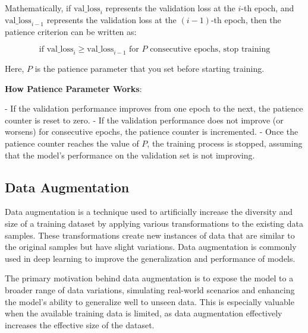 \documentclass{report}
\begin{document}
Mathematically, if \( \text{val\_loss}_i \) represents the validation loss at the \( i \)-th epoch, and \( \text{val\_loss}_{i-1} \) represents the validation loss at the \( (i-1) \)-th epoch, then the patience criterion can be written as:

\[ \text{if } \text{val\_loss}_i \geq \text{val\_loss}_{i-1} \text{ for } P \text{ consecutive epochs, stop training} \]

Here, \( P \) is the patience parameter that you set before starting training.

\textbf{How Patience Parameter Works}:

- If the validation performance improves from one epoch to the next, the patience counter is reset to zero.
- If the validation performance does not improve (or worsens) for consecutive epochs, the patience counter is incremented.
- Once the patience counter reaches the value of \( P \), the training process is stopped, assuming that the model's performance on the validation set is not improving.


\subsection{Data Augmentation}

Data augmentation is a technique used to artificially increase the diversity and size of a training dataset by applying various transformations to the existing data samples. These transformations create new instances of data that are similar to the original samples but have slight variations. Data augmentation is commonly used in deep learning to improve the generalization and performance of models.

The primary motivation behind data augmentation is to expose the model to a broader range of data variations, simulating real-world scenarios and enhancing the model's ability to generalize well to unseen data. This is especially valuable when the available training data is limited, as data augmentation effectively increases the effective size of the dataset.
\end{document}
